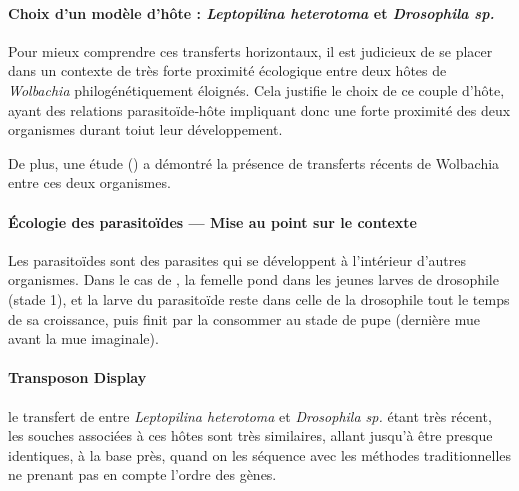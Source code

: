 \paragraph{Choix d’un modèle d’hôte : \textit{Leptopilina heterotoma} et \textit{Drosophila sp.}\\}
Pour mieux comprendre ces transferts horizontaux, il est judicieux de se placer dans un contexte de très forte proximité écologique entre deux hôtes de \textit{Wolbachia} philogénétiquement éloignés. Cela justifie le choix de ce couple d’hôte, ayant des relations parasitoïde‐hôte impliquant donc une forte proximité des deux organismes durant toiut leur développement.

De plus, une étude (\cite{vavre1999}) a démontré la présence de transferts récents de Wolbachia entre ces deux organismes.

\begin{encart} %
	\paragraph{Écologie des parasitoïdes — Mise au point sur le contexte} %
	\label{par:parasitoïdes}
	Les parasitoïdes sont des parasites qui se développent à l’intérieur d’autres organismes. Dans le cas de , la femelle pond dans les jeunes larves de drosophile (stade 1), et la larve du parasitoïde reste dans celle de la drosophile tout le temps de sa croissance, puis finit par la consommer au stade de pupe (dernière mue avant la mue imaginale).
\end{encart}

\paragraph{Transposon Display\\} %
\label{par:transposon_display}
le transfert de  entre \textit{Leptopilina heterotoma} et \textit{Drosophila sp.} étant très récent, les souches associées à ces hôtes sont très similaires, allant jusqu’à être presque identiques, à la base près, quand on les séquence avec les méthodes traditionnelles ne prenant pas en compte l’ordre des gènes.

